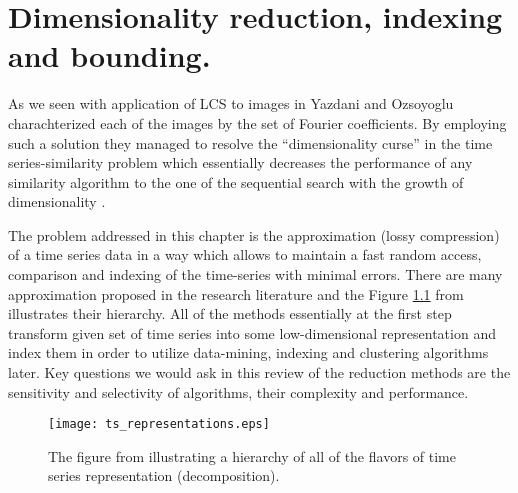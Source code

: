 \chapter{Dimensionality reduction, indexing and bounding.}
As we seen with application of LCS to images in \cite{citeulike:4367061} Yazdani and Ozsoyoglu charachterized each of the images by the set of Fourier coefficients. By employing such a solution they managed to resolve the ``dimensionality curse'' in the time series-similarity problem which essentially decreases the performance of any similarity algorithm to the one of the sequential search with the growth of dimensionality \cite{citeulike:4384496} \cite{citeulike:2843857} \cite{citeulike:4384489} \cite{citeulike:343069}.

The problem addressed in this chapter is the approximation (lossy compression) of a time series data in a way which allows to maintain a fast random access, comparison and indexing of the time-series with minimal errors. There are many approximation proposed in the research literature and the Figure \ref{fig:approximations} from \cite{citeulike:2821475} illustrates their hierarchy. All of the methods essentially at the first step transform given set of time series into some low-dimensional representation and index them in order to utilize data-mining, indexing and clustering algorithms later. Key questions we would ask in this review of the reduction methods are the sensitivity and selectivity of algorithms, their complexity and performance.

\begin{figure}[tbp]
   \centering
   \texttt{[image: ts\_representations.eps]}
   \caption{The figure from \cite{citeulike:2821475} illustrating a hierarchy of all of the flavors of time series representation (decomposition).}
   \label{fig:approximations}
\end{figure} 
